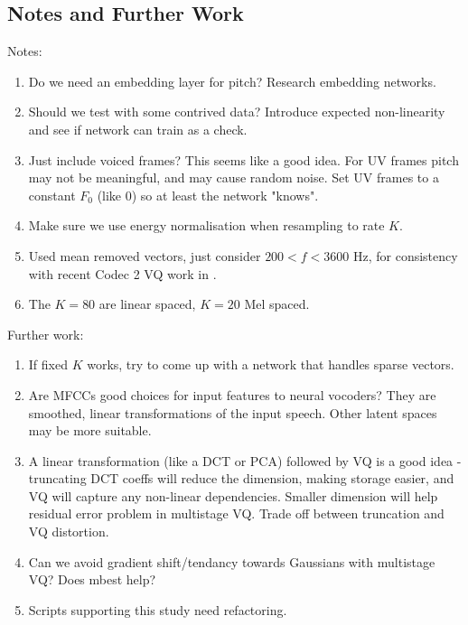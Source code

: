 \documentclass{article}
\begin{document}
\subsection{Notes and Further Work}

Notes:
\begin{enumerate}
\item Do we need an embedding layer for pitch?  Research embedding networks.
\item Should we test with some contrived data?  Introduce expected non-linearity and see if network can train as a check.
\item Just include voiced frames?  This seems like a good idea.  For UV frames pitch may not be meaningful, and may cause random noise. Set UV frames to a constant $F_0$ (like 0) so at least the network "knows".
\item Make sure we use energy normalisation \cite{rowe2023_ratek_study} when resampling to rate $K$.
\item Used mean removed vectors, just consider $200 < f < 3600$ Hz, for consistency with recent Codec 2 VQ work in \cite{rowe2023_ratek_study}.
\item The $K=80$ are linear spaced, $K=20$ Mel spaced.
\end{enumerate}

Further work:
\begin{enumerate}
\item If fixed $K$ works, try to come up with a network that handles sparse vectors.
\item Are MFCCs good choices for input features to neural vocoders? They are smoothed, linear transformations of the input speech.  Other latent spaces may be more suitable.
\item A linear transformation (like a DCT or PCA) followed by VQ is a good idea - truncating DCT coeffs will reduce the dimension, making storage easier, and VQ will capture any non-linear dependencies.  Smaller dimension will help residual error problem in multistage VQ. Trade off between truncation and VQ distortion.
\item Can we avoid gradient shift/tendancy towards Gaussians with multistage VQ?  Does mbest help?
\item Scripts supporting this study need refactoring.
\end{enumerate}




\end{document}
